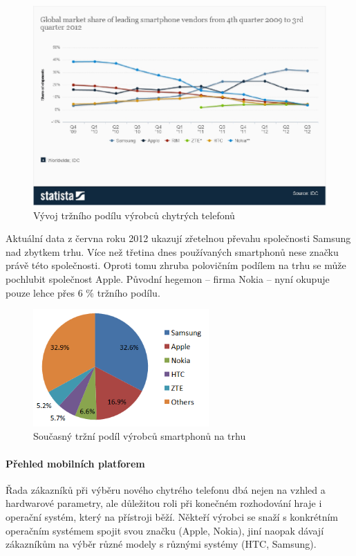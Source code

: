 \begin{figure}\centering
\includegraphics[width=1.0\textwidth]{smartphone_marketshare_vendors.eps}
\caption{Vývoj tržního podílu výrobců chytrých telefonů}
\label{fig:VyrobciSmartphoneRozsireni}
\end{figure}

Aktuální data z června roku 2012 ukazují zřetelnou převahu společnosti Samsung nad zbytkem trhu. Více než třetina dnes používaných smartphonů nese značku právě této společnosti. Oproti tomu zhruba polovičním podílem na trhu se může pochlubit společnost Apple. Původní hegemon – firma Nokia – nyní okupuje pouze lehce přes 6 \% tržního podílu.

\begin{figure}\centering
\includegraphics[width=0.6\textwidth]{smartphone_by_manufaturers.png}
\caption{Současný tržní podíl výrobců smartphonů na trhu}
\label{fig:VyrobciSmartphoneRozsireni2}
\end{figure}

\paragraph{Přehled mobilních platforem}
Řada zákazníků při výběru nového chytrého telefonu dbá nejen na vzhled a hardwarové parametry, ale důležitou roli při konečném rozhodování hraje i operační systém, který na přístroji běží. Někteří výrobci se snaží s konkrétním operačním systémem spojit svou značku (Apple, Nokia), jiní naopak dávají zákazníkům na výběr různé modely s různými systémy (HTC, Samsung).

